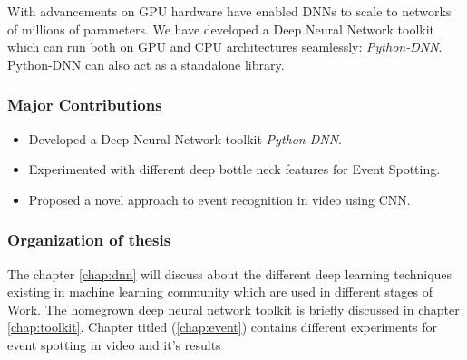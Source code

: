 With advancements on GPU hardware have enabled DNNs to scale to networks of millions of parameters. We have developed a Deep Neural Network toolkit which can run both on GPU and CPU architectures seamlessly: \textit{Python-DNN}. Python-DNN can also act as a standalone library.

\subsubsection{Major Contributions}
\begin{itemize}
\item Developed a Deep Neural Network toolkit-\textit{Python-DNN}. 
\item Experimented with different deep bottle neck features for Event Spotting.
\item Proposed a novel approach to event recognition in video using CNN.
\end{itemize}

\subsubsection{Organization of thesis}
The chapter \ref{chap:dnn} will discuss about the different deep learning techniques existing in machine learning community which are used in different stages of Work. The homegrown deep neural network toolkit is briefly discussed in chapter \ref{chap:toolkit}. Chapter titled  (\ref{chap:event}) contains different experiments for event spotting in video and it's results  